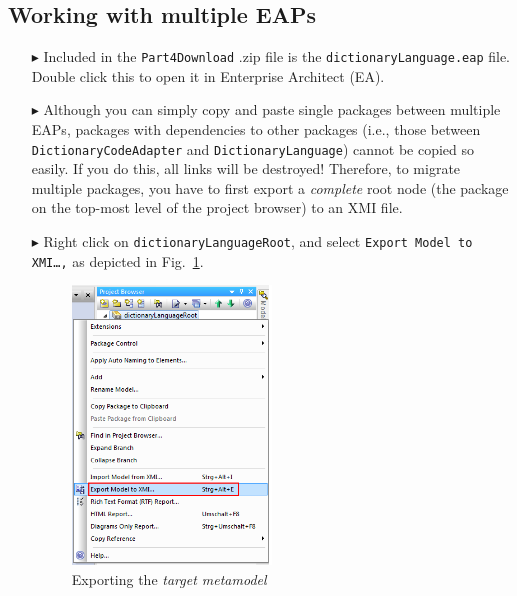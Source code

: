 \newpage
\subsection{Working with multiple EAPs}
\visHeader
\label{sec:multiEAP}

\begin{itemize}

\item[$\blacktriangleright$] Included in the \texttt{Part4Download} .zip file is the \texttt{dictionaryLanguage.eap} file. Double click this to open it in
Enterprise Architect (EA).

\vspace{0.5cm}

\item[$\blacktriangleright$] Although you can simply copy and paste single packages between multiple EAPs, packages with dependencies to other packages (i.e.,
those between \texttt{DictionaryCodeAdapter} and \texttt{DictionaryLanguage}) cannot be copied so easily. If you do this, all links will be destroyed!
Therefore, to migrate multiple packages, you have to first export a \emph{complete} root node (the package on the top-most level of the project browser) to an
XMI file.

\vspace{0.5cm}

\item[$\blacktriangleright$] Right click on \texttt{dictionaryLanguageRoot}, and select \texttt{Export Model to XMI\ldots,} as depicted in
Fig.~\ref{fig:export}.

\vspace{0.5cm}

\begin{figure}[htbp]
\begin{center}
  \includegraphics[width=0.5\textwidth]{ea_exportToXMI}
  \caption{Exporting the \emph{target metamodel}}
  \label{fig:export}
\end{center}
\end{figure}


\end{itemize}
